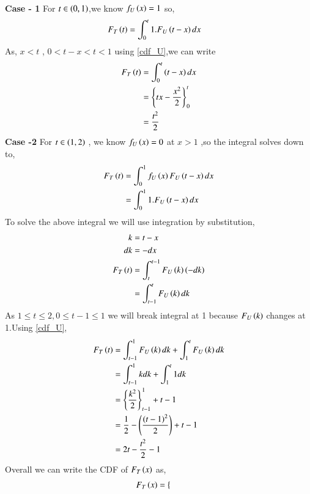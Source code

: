 \documentclass[journal,12pt,twocolumn]{IEEEtran}
\renewcommand\thesection{\arabic{section}}
\begin{document}
\begin{enumerate}[label=\thesection.\arabic*,ref=\thesection.\theenumi]
\begin{enumerate}[label=\thesection.\arabic*
,ref=\thesection.\theenumi]
\begin{align}
   \end{align}
\textbf{Case - 1} For $ t \in \left(0,1\right) $,we know $f_{U}\left(x\right) = 1$ so,
  \begin{align}
          F_{T}\left(t\right) &= \int_{0}^{t}1.F_{U}\left(t-x\right)dx
  \end{align}
        As, $x<t$ , $ 0<t-x< t<1$ using \eqref{cdf_U},we can write
  \begin{align}
         F_{T}\left(t\right) &= \int_{0}^{t}\left(t-x\right)dx\\
                       &= \left\{ tx - \frac{x^2}{2}\right\}_{0}^{t}\\
                       &= \frac{t^{2}}{2}
  \end{align}
 \textbf{Case -2} For $ t \in \left(1,2\right)$ , we know $f_{U}\left(x\right) = 0$ at $ x > 1$ ,so the integral solves down to,
  \begin{align}
          F_{T}\left(t\right) &= \int_{0}^{1}f_{U}\left(x\right)F_{U}\left(t-x\right)dx\\
                        &= \int_{0}^{1}1.F_{U}\left(t-x\right)dx\\
  \end{align}
   To solve the above integral we will use integration by substitution,
   \begin{align}
            k &= t-x\\
           dk &= -dx\\
           F_{T}\left(t\right) &= \int_{t}^{t-1}F_{U}\left(k\right)\left(-dk\right)\\
                         &= \int_{t-1}^{t}F_{U}\left(k\right)dk
   \end{align}
   As $ 1 \leq t \leq 2 , 0 \leq t-1 \leq 1 $ we will break integral at 1 because $ F_{U}\left(k\right)$ changes at 1.Using \eqref{cdf_U},
   \begin{align}
           F_{T}\left(t\right)  &= \int_{t-1}^{1}F_{U}\left(k\right)dk + \int_{1}^{t}F_{U}\left(k\right)dk \\
                          &= \int_{t-1}^{1}kdk + \int_{1}^{t}1dk\\
                          &= \left\{\frac{k^{2}}{2}\right\}_{t-1}^{1} + t - 1\\
                          &= \frac{1}{2} -\left(\frac{\left(t-1\right)^{2}}{2}\right) + t - 1\\
                          &= 2t - \frac{t^{2}}{2} - 1
   \end{align}
   Overall we can write the CDF of $F_{T}\left(x\right)$ as,
   \begin{align}
           F_{T}\left(x\right) &=   \begin{cases}

\end{cases}
\end{align}
\end{enumerate}
\end{enumerate}
\end{document}
